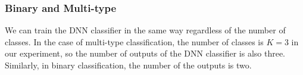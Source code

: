 \documentclass[useamsfonts]{pasj01}
\begin{document}




\subsubsection{Binary and Multi-type}
We can train the DNN classifier in the same way regardless of the number of classes.
In the case of multi-type classification, the number of classes is $K = 3$ in our experiment, so the number of outputs of the DNN classifier is also three.
Similarly, in binary classification, the number of the outputs is two.
\end{document}
